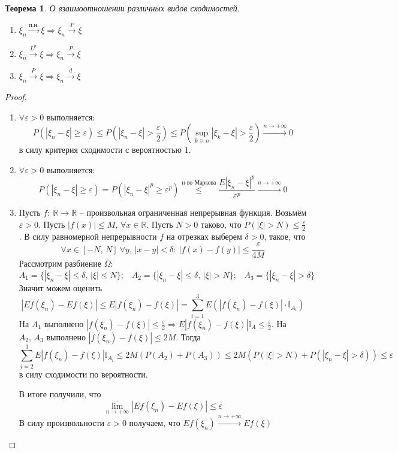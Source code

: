 \documentclass[a4paper,12pt]{article}
\renewcommand{\leq}{\ensuremath{\leqslant}}
\renewcommand{\geq}{\ensuremath{\geqslant}}
\theoremstyle{plain}
\newtheorem{theorem}{Теорема}[section]
\theoremstyle{definition}
\theoremstyle{remark}
\begin{document}
\begin{theorem}
	О взаимоотношении различных видов сходимостей.

	\begin{enumerate}
		\item $\xi_n \stackrel{\text{п.н.}}{\to} \xi \Rightarrow \xi_n \stackrel{P}{\to} \xi$
		\item $\xi_n \stackrel{L^p}{\to} \xi \Rightarrow \xi_n \stackrel{P}{\to} \xi$
		\item $\xi_n \stackrel{P}{\to} \xi \Rightarrow \xi_n \stackrel{d}{\to} \xi$
	\end{enumerate}
\end{theorem}

\begin{proof}
	\begin{enumerate}
		\item $\forall \varepsilon > 0$ выполняется:
		      \[P(|\xi_n - \xi| \geq \varepsilon) \leq P\left(|\xi_n - \xi| > \frac{\varepsilon}{2}\right) \leq P\left(\sup_{k \geq n}|\xi_k - \xi| > \frac{\varepsilon}{2}\right) \stackrel{n \to +\infty}{\to} 0\]
		      в силу критерия сходимости с вероятностью $1$.

		\item $\forall \varepsilon > 0$ выполняется:
		      \[P(|\xi_n - \xi| \geq \varepsilon) = P(|\xi_n - \xi|^p \geq \varepsilon^p) \stackrel{\text{н-во Маркова}}{\leq} \frac{E|\xi_n - \xi|^p}{\varepsilon^p} \stackrel{n \to +\infty}{\to} 0\]

		\item Пусть $f:\: \mathbb{R} \to \mathbb{R}$ -- произвольная ограниченная непрерывная функция. Возьмём $\varepsilon > 0$.  Пусть $|f(x)| \leq M,\, \forall x \in \mathbb{R}$. Пусть $N > 0$ таково, что $P(|\xi| > N) \leq \frac{\varepsilon}{2}$. В силу равномерной непрерывности $f$ на отрезках выберем $\delta > 0$, такое, что
		      \[\forall x \in [-N,\, N] \: \forall y,\, |x - y| < \delta:\: |f(x) - f(y)| \leq \frac{\varepsilon}{4M}\]
		      Рассмотрим разбиение $\Omega$:
		      \[A_1 = \{|\xi_n - \xi| \leq \delta,\, |\xi| \leq N\};\;\;\; A_2 = \{|\xi_n - \xi| \leq \delta,\, |\xi| > N\};\;\;\; A_3 = \{|\xi_n - \xi| > \delta\}\]
		      Значит можем оценить
		      \[|Ef(\xi_n) - Ef(\xi)| \leq E|f(\xi_n) - f(\xi)| = \sum_{i = 1}^3 E(|f(\xi_n) - f(\xi)|\cdot\mathbb{I}_{A_i})\]
		      На $A_1$ выполнено $|f(\xi_n) - f(\xi)| \leq \frac{\varepsilon}{2} \Rightarrow E|f(\xi_n) - f(\xi)|\mathbb{I}_A \leq \frac{\varepsilon}{2}$. На $A_2,\, A_3$ выполнено $|f(\xi_n) - f(\xi)| \leq 2M$. Тогда
		      \[\sum_{i = 2}^3 E|f(\xi_n) - f(\xi)|\mathbb{I}_{A_i} \leq 2M(P(A_2) + P(A_3)) \leq 2M(P(|\xi| > N) + P(|\xi_n - \xi| > \delta)) \leq \varepsilon\]
		      в силу сходимости по вероятности.

		      В итоге получили, что
		      \[\overline{\lim_{n \to +\infty}}|Ef(\xi_n) - Ef(\xi)| \leq \varepsilon\]
		      В силу произвольности $\varepsilon > 0$ получаем, что $Ef(\xi_n) \stackrel{n \to +\infty}{\to} Ef(\xi)$
	\end{enumerate}
\end{proof}
\end{document}
